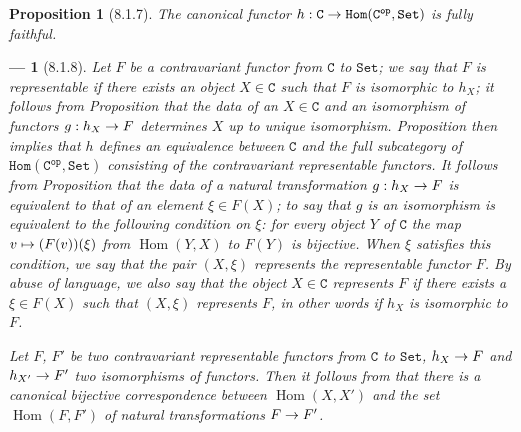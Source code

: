 \documentclass[oneside]{amsart}
\theoremstyle{ega-env-style}
\newtheorem*{env}{---}
\theoremstyle{ega-thm-env-style}
\newtheorem*{proposition}{Proposition}
\theoremstyle{ega-defn-env-style}
\def\cat{\mathtt}                   %
\def\C{\cat{C}}                     %
\def\op{^\cat{op}}                  %
\def\Set{\cat{Set}}                 %
\def\CHom{\cat{Hom}}                %
\def\Hom{\operatorname{Hom}}
\renewcommand{\to}{\mathchoice{\longrightarrow}{\rightarrow}{\rightarrow}{\rightarrow}}
\let\mapstoo\mapsto
\renewcommand{\mapsto}{\mathchoice{\longmapsto}{\mapstoo}{\mapstoo}{\mapstoo}}
\let\EGAOriginalLabel\label
\renewcommand{\label}[1]{\phantomsection\EGAOriginalLabel{#1}}
\begin{document}
\begin{proposition}[8.1.7]
\label{0.8.1.7}
The canonical functor $h:\C\to\CHom(\C\op,\Set)$ is fully faithful.
\end{proposition}

\begin{env}[8.1.8]
\label{0.8.1.8}
Let $F$ be a contravariant functor from $\C$ to $\Set$; we say that $F$ is \emph{representable} if there
exists an object $X\in\C$ such that $F$ is \emph{isomorphic} to $h_X$; it follows from
Proposition  that the data of an $X\in\C$ and an isomorphism of functors
$g:h_X\to F$ determines $X$ up to unique isomorphism. Proposition  then
implies that $h$ defines an \emph{equivalence} between $\C$ and the full subcategory of
$\CHom(\C\op,\Set)$ consisting of the \emph{contravariant representable functors}. It follows from
Proposition  that the data of a natural transformation $g:h_X\to F$ is
equivalent to that of an element $\xi\in F(X)$; to say that $g$ is an \emph{isomorphism} is
equivalent to the following condition on $\xi$: \emph{for every object $Y$ of $\C$ the map
$v\mapsto(F(v))(\xi)$ from $\Hom(Y,X)$ to $F(Y)$ is bijective}. When $\xi$ satisfies this condition,
we say that the pair $(X,\xi)$ \emph{represents} the representable functor $F$. By abuse of language,
we also say that the object $X\in\C$ represents $F$ if there exists a $\xi\in F(X)$ such that
$(X,\xi)$ represents $F$, in other words if $h_X$ is isomorphic to $F$.

Let $F$, $F'$ be two contravariant representable functors from $\C$ to $\Set$, $h_X\to F$ and
$h_{X'}\to F'$ two isomorphisms of functors. Then it follows from  that
there is a canonical bijective correspondence between $\Hom(X,X')$ and the set $\Hom(F,F')$ of
natural transformations $F\to F'$.
\end{env}
\end{document}
